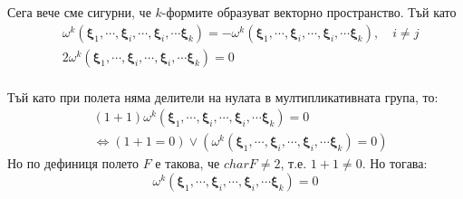 \documentclass[12pt]{article}
\newcommand\myxi[0]{\boldsymbol{\xi}}
\begin{document}
\begin{large}
  Сега вече сме сигурни, че $k$-формите образуват векторно пространство. Тъй като
  \begin{align*}
    &\omega^k(\myxi_1,\cdots,\myxi_i,\cdots,\myxi_i,\cdots\myxi_k)=-\omega^k(\myxi_1,\cdots,\myxi_i,\cdots,\myxi_i,\cdots\myxi_k), \quad i \neq j \\
    &2\omega^k(\myxi_1,\cdots,\myxi_i,\cdots,\myxi_i,\cdots\myxi_k)=0 \\
  \end{align*}

\begin{comment}
тo в зависимост от $F$ има два случая:
\begin{enumerate}
\item $F$ е крайно, то  $\omega^k(\myxi_1,\cdots,\myxi_i,\cdots,\myxi_i,\cdots\myxi_k) \in \left\{a\in F \lvert a+a=0 \right\}$
\item $F$ е безкрайно, то  $\omega^k(\myxi_1,\cdots,\myxi_i,\cdots,\myxi_i,\cdots\myxi_k) \in \left\{a\in F \lvert a+a=0 \right\}$
\end{enumerate}
\end{comment}
  Тъй като  при полета няма делители на нулата в мултипликативната група, то:
  \begin{align*}
    &(1+1)\omega^k(\myxi_1,\cdots,\myxi_i,\cdots,\myxi_i,\cdots\myxi_k)=0 \\
    &\Longleftrightarrow (1+1=0) \lor (\omega^k(\myxi_1,\cdots,\myxi_i,\cdots,\myxi_i,\cdots\myxi_k)=0)
  \end{align*}
  Но по дефиниця полето $F$ е такова, че $char F \neq 2$, т.е. $1+1 \neq 0$. Но тогава:
  \[\omega^k(\myxi_1,\cdots,\myxi_i,\cdots,\myxi_i,\cdots\myxi_k)=0
  \]


\end{large}
\end{document}
